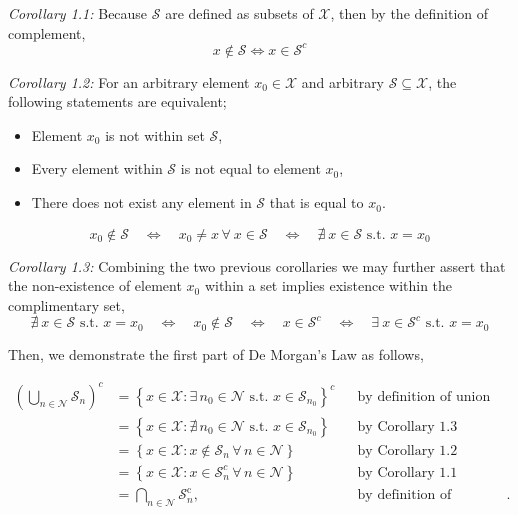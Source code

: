 \documentclass[12 pt,letterpaper]{article}
\newcommand{\calN}{\mathcal{N}}
\newcommand{\calS}{\mathcal{S}}
\newcommand{\rmc}{\mathrm{c}}
\begin{document}
\emph{Corollary 1.1:}
Because \(\mathcal{S}\) are defined as subsets of \(\mathcal{X}\),
then by the definition of complement,
\[x\notin\mathcal{S} \Leftrightarrow x\in\mathcal{S}^c\] 

\emph{Corollary 1.2:}
For an arbitrary element \(x_0\in\mathcal{X}\) and arbitrary \(\mathcal{S}\subseteq\mathcal{X}\),
the following statements are equivalent;
\begin{itemize}
    \item Element \(x_0\) is not within set \(\mathcal{S}\),
    \item Every element within \(\mathcal{S}\) is not equal to element \(x_0\),
    \item There does not exist any element in \(\mathcal{S}\) that is equal to \(x_0\).
\end{itemize}
\[
    x_0 \notin \mathcal{S}
    \quad \Leftrightarrow \quad
    x_0 \neq x \,\forall\ x \in \mathcal{S}
    \quad \Leftrightarrow \quad
    \nexists\ x \in \mathcal{S} \text{ s.t. } x = x_0
\]

\emph{Corollary 1.3:}
Combining the two previous corollaries we may further assert that the non-existence of element 
\(x_0\) within a set implies existence within the complimentary set,
\[
    \nexists\ x \in \mathcal{S} \text{ s.t. } x = x_0
    \quad \Leftrightarrow \quad
    x_0 \notin \mathcal{S}
    \quad \Leftrightarrow \quad
    x\in\mathcal{S}^c
    \quad \Leftrightarrow \quad
    \exists\ x \in \mathcal{S}^c \text{ s.t. } x = x_0
\]

Then, we demonstrate the first part of De Morgan's Law as follows,

\begin{align*}
    \left(\bigcup_{n\in\mathcal{N}} \mathcal{S}_n\right)^c
    &= \left\{x \in \mathcal{X} : \exists\, n_0 \in \mathcal{N}
        \text{ s.t. } x \in \mathcal{S}_{n_0}\right\}^c && \text{by definition of union}\\
    &= \left\{x \in \mathcal{X} : \nexists\, n_0 \in \mathcal{N}
        \text{ s.t. } x \in \mathcal{S}_{n_0}\right\} && \text{by Corollary 1.3}\\
    &= \left\{x \in \mathcal{X} : x \notin \mathcal{S}_{n}
        \,\forall\, n \in \mathcal{N} \right\} && \text{by Corollary 1.2}\\
    &= \left\{x \in \mathcal{X} : x \in \mathcal{S}_{n}^{c}
        \,\forall\, n \in \mathcal{N} \right\} && \text{by Corollary 1.1}\\
    &= \bigcap_{n\in\calN}\calS_n^\rmc, && \text{by definition of intersection}.
\end{align*}
\end{document}

